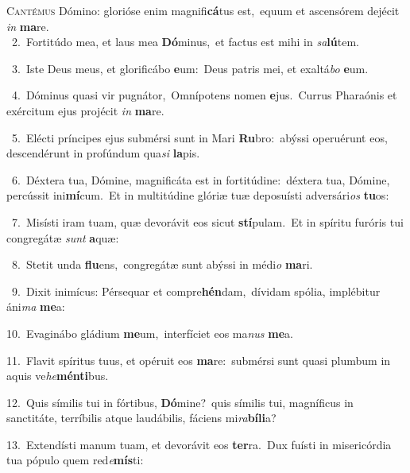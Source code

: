 \lettrine{\initial\textcolor{\initialcolor}{C}}{antémus} Dómino: glorióse enim magnifi\-\textbf{cá}\-tus est,~\star equum et ascensórem dejécit \textit{in} \textbf{ma}\-re.\\
{\numbfont\textcolor{\numbcolor}{~2.}}~Fortitúdo mea, et laus mea \textbf{Dó}\-minus,~\star et factus est mihi in \textit{sa}\-\textbf{lú}tem.\par
{\numbfont\textcolor{\numbcolor}{~3.}}~Iste Deus meus, et glorificábo \textbf{e}\-um:~\star Deus patris mei, et exaltá\textit{bo} \textbf{e}\-um.\par
{\numbfont\textcolor{\numbcolor}{~4.}}~Dóminus quasi vir pugnátor,~\dagger Omnípotens nomen \textbf{e}\-jus.~\star Currus Pharaónis et exércitum ejus projécit \textit{in} \textbf{ma}\-re.\par
{\numbfont\textcolor{\numbcolor}{~5.}}~Elécti príncipes ejus submérsi sunt in Mari \textbf{Ru}\-bro:~\star abýssi operuérunt eos, descendérunt in profúndum qua\textit{si} \textbf{la}\-pis.\par
{\numbfont\textcolor{\numbcolor}{~6.}}~Déxtera tua, Dómine, magnificáta est in fortitúdine:~\dagger déxtera tua, Dómine, percússit ini\-\textbf{mí}\-cum.~\star Et in multitúdine glóriæ tuæ deposuísti adversári\textit{os} \textbf{tu}\-os:\par
{\numbfont\textcolor{\numbcolor}{~7.}}~Misísti iram tuam, quæ devorávit eos sicut \textbf{stí}\-pulam.~\star Et in spíritu furóris tui congregátæ \textit{sunt} \textbf{a}\-quæ:\par
{\numbfont\textcolor{\numbcolor}{~8.}}~Stetit unda \textbf{flu}\-ens,~\star congregátæ sunt abýssi in médi\textit{o} \textbf{ma}\-ri.\par
{\numbfont\textcolor{\numbcolor}{~9.}}~Dixit inimícus: Pérsequar et compre\-\textbf{hén}\-dam,~\star dívidam spólia, implébitur áni\textit{ma} \textbf{me}\-a:\par
{\numbfont\textcolor{\numbcolor}{10.}}~Evaginábo gládium \textbf{me}\-um,~\star interfíciet eos ma\textit{nus} \textbf{me}\-a.\par
{\numbfont\textcolor{\numbcolor}{11.}}~Flavit spíritus tuus, et opéruit eos \textbf{ma}\-re:~\star submérsi sunt quasi plumbum in aquis ve\-\textit{he}\-\textbf{mén}\textbf{ti}bus.\par
{\numbfont\textcolor{\numbcolor}{12.}}~Quis símilis tui in fórtibus, \textbf{Dó}\-mine?~\star quis símilis tui, magníficus in sanctitáte, terríbilis atque laudábilis, fáciens mi\-\textit{ra}\-\textbf{bí}\textbf{li}a?\par
{\numbfont\textcolor{\numbcolor}{13.}}~Extendísti manum tuam, et devorávit eos \textbf{ter}\-ra.~\star Dux fuísti in misericórdia tua pópulo quem red\-\textit{e}\-\textbf{mís}ti:\par
